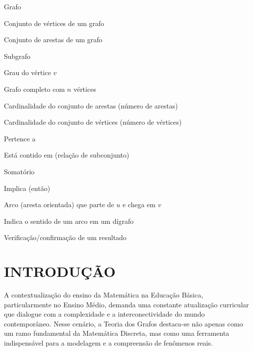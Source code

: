 \documentclass[
  12pt,
  oneside,
  a4paper,
  english,
  brazilian
  ]{abntex2}
\theoremstyle{definition}
\begin{document}
\begin{simbolos}
  \item[$\mathcal{G}$] Grafo
  \item[$\mathcal{V}$] Conjunto de vértices de um grafo
  \item[$\mathcal{A}$] Conjunto de arestas de um grafo
  \item[$\mathcal{H}$] Subgrafo
  \item[$\delta(v)$] Grau do vértice $v$
  \item[$K_n$] Grafo completo com $n$ vértices
  \item[$|\mathcal{A}|$] Cardinalidade do conjunto de arestas (número de arestas)
  \item[$|\mathcal{V}|$] Cardinalidade do conjunto de vértices (número de vértices)
  \item[$\in$] Pertence a
  \item[$\subseteq$] Está contido em (relação de subconjunto)
  \item[$\sum$] Somatório
  \item[$\implies$] Implica (então)
  \item[$(u,\, v)$] Arco (aresta orientada) que parte de $u$ e chega em $v$
  \item[$\to$] Indica o sentido de um arco em um dígrafo
  \item[$\checkmark$] Verificação/confirmação de um resultado
\end{simbolos}

\tableofcontents*
\cleardoublepage

\textual

\chapter{INTRODUÇÃO}

A contextualização do ensino da Matemática na Educação Básica, particularmente
no Ensino Médio, demanda uma constante atualização curricular que dialogue com a
complexidade e a interconectividade do mundo contemporâneo. Nesse cenário, a
Teoria dos Grafos destaca-se não apenas como um ramo fundamental da Matemática
Discreta, mas como uma ferramenta indispensável para a modelagem e a compreensão
de fenômenos reais.
\end{document}
